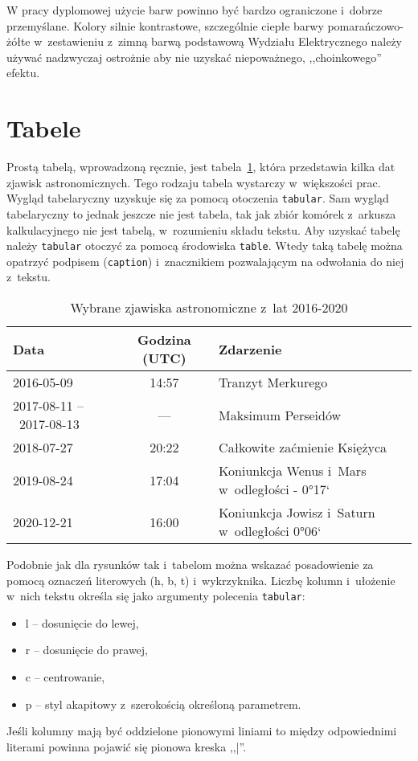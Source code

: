 W pracy dyplomowej użycie barw powinno być bardzo ograniczone i~dobrze przemyślane. Kolory silnie kontrastowe, szczególnie ciepłe barwy pomarańczowo-żółte w~zestawieniu z~zimną barwą podstawową Wydziału Elektrycznego należy używać nadzwyczaj ostrożnie aby nie uzyskać niepoważnego, ,,choinkowego'' efektu.

\section{Tabele}
Prostą tabelą, wprowadzoną ręcznie, jest tabela~\ref{tab:zjawiska}, która przedstawia kilka dat zjawisk astronomicznych. Tego rodzaju tabela wystarczy w~większości prac. Wygląd tabelaryczny uzyskuje się za pomocą otoczenia \texttt{tabular}. Sam wygląd tabelaryczny to jednak jeszcze nie jest tabela, tak jak zbiór komórek z~arkusza kalkulacyjnego nie jest tabelą, w~rozumieniu składu tekstu. Aby uzyskać tabelę należy \texttt{tabular} otoczyć za pomocą środowiska \texttt{table}. Wtedy taką tabelę można opatrzyć podpisem (\texttt{caption}) i~znacznikiem pozwalającym na odwołania do niej z~tekstu.

\begin{table}[h]
 \centering
  \begin{tabular}{p{2.5cm}c|l}
    Data        &   Godzina (UTC)   &   Zdarzenie\\\hline\hline
    2016-05-09  &   14:57           &   Tranzyt Merkurego\\\hline
    2017-08-11 --~2017-08-13  & --- &   Maksimum Perseidów \\\hline
    2018-07-27  &   20:22           &   Całkowite zaćmienie Księżyca\\\hline
    2019-08-24  &   17:04           &   Koniunkcja Wenus i~Mars w~odległości - 0°17`\\\hline
    2020-12-21  &   16:00           &   Koniunkcja Jowisz i~Saturn w~odległości 0°06`
  \end{tabular}
 \caption{\label{tab:zjawiska}Wybrane zjawiska astronomiczne z~lat 2016-2020}
\end{table}

Podobnie jak dla rysunków tak i~tabelom można wskazać posadowienie za pomocą oznaczeń literowych (h, b, t) i~wykrzyknika. Liczbę kolumn i~ułożenie w~nich tekstu określa się jako argumenty polecenia \texttt{tabular}:
\begin{itemize}
    \item l -- dosunięcie do lewej,
    \item r -- dosunięcie do prawej,
    \item c -- centrowanie,
    \item p -- styl akapitowy z~szerokością określoną parametrem.
\end{itemize}
Jeśli kolumny mają być oddzielone pionowymi liniami to między odpowiednimi literami powinna pojawić się pionowa kreska ,,|''.

